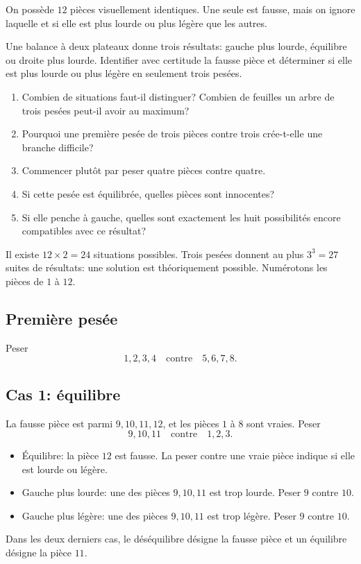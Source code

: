 \documentclass[11pt,a4paper]{article}
\begin{document}

\begin{statementbox}
On possède $12$ pièces visuellement identiques. Une seule est fausse, mais on
ignore laquelle et si elle est plus lourde ou plus légère que les autres.

Une balance à deux plateaux donne trois résultats: gauche plus lourde,
équilibre ou droite plus lourde. Identifier avec certitude la fausse pièce et
déterminer si elle est plus lourde ou plus légère en seulement trois pesées.
\end{statementbox}

\begin{hintsbox}
\begin{enumerate}
  \item Combien de situations faut-il distinguer? Combien de feuilles un
  arbre de trois pesées peut-il avoir au maximum?
  \item Pourquoi une première pesée de trois pièces contre trois crée-t-elle
  une branche difficile?
  \item Commencer plutôt par peser quatre pièces contre quatre.
  \item Si cette pesée est équilibrée, quelles pièces sont innocentes?
  \item Si elle penche à gauche, quelles sont exactement les huit possibilités
  encore compatibles avec ce résultat?
\end{enumerate}
\end{hintsbox}

\correction

Il existe $12\times2=24$ situations possibles. Trois pesées donnent au plus
$3^3=27$ suites de résultats: une solution est théoriquement possible.
Numérotons les pièces de $1$ à $12$.

\subsection*{Première pesée}
Peser
\[
1,2,3,4\quad\text{contre}\quad5,6,7,8.
\]

\subsection*{Cas 1: équilibre}
La fausse pièce est parmi $9,10,11,12$, et les pièces $1$ à $8$ sont vraies.
Peser
\[
9,10,11\quad\text{contre}\quad1,2,3.
\]
\begin{itemize}
  \item Équilibre: la pièce $12$ est fausse. La peser contre une vraie pièce
  indique si elle est lourde ou légère.
  \item Gauche plus lourde: une des pièces $9,10,11$ est trop lourde. Peser
  $9$ contre $10$.
  \item Gauche plus légère: une des pièces $9,10,11$ est trop légère. Peser
  $9$ contre $10$.
\end{itemize}
Dans les deux derniers cas, le déséquilibre désigne la fausse pièce et un
équilibre désigne la pièce $11$.
\end{document}
